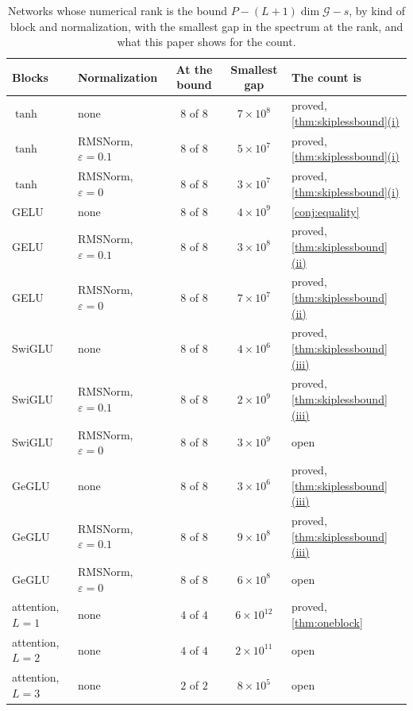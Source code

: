 \documentclass[10pt]{article}
\theoremstyle{definition}
\theoremstyle{remark}
\newcommand{\G}{\mathcal{G}}
\DeclareRobustCommand{\cpref}[2]{\hyperref[#1:#2]{\cref*{#1}(#2)}}
\begin{document}
\begin{table}[ht]
\centering\small
\renewcommand{\arraystretch}{1.1}
\begin{tabular}{@{}llccl@{}}
\toprule
\textbf{Blocks} & \textbf{Normalization} & \textbf{At the bound} & \textbf{Smallest gap} & \textbf{The count is} \\
\midrule
$\tanh$ & none & $8$ of $8$ & $7\times10^{8}$ & proved, \cpref{thm:skiplessbound}{i} \\
$\tanh$ & RMSNorm, $\varepsilon = 0.1$ & $8$ of $8$ & $5\times10^{7}$ & proved, \cpref{thm:skiplessbound}{i} \\
$\tanh$ & RMSNorm, $\varepsilon = 0$ & $8$ of $8$ & $3\times10^{7}$ & proved, \cpref{thm:skiplessbound}{i} \\
GELU & none & $8$ of $8$ & $4\times10^{9}$ & \cref{conj:equality} \\
GELU & RMSNorm, $\varepsilon = 0.1$ & $8$ of $8$ & $3\times10^{8}$ & proved, \cpref{thm:skiplessbound}{ii} \\
GELU & RMSNorm, $\varepsilon = 0$ & $8$ of $8$ & $7\times10^{7}$ & proved, \cpref{thm:skiplessbound}{ii} \\
SwiGLU & none & $8$ of $8$ & $4\times10^{6}$ & proved, \cpref{thm:skiplessbound}{iii} \\
SwiGLU & RMSNorm, $\varepsilon = 0.1$ & $8$ of $8$ & $2\times10^{9}$ & proved, \cpref{thm:skiplessbound}{iii} \\
SwiGLU & RMSNorm, $\varepsilon = 0$ & $8$ of $8$ & $3\times10^{9}$ & open \\
GeGLU & none & $8$ of $8$ & $3\times10^{6}$ & proved, \cpref{thm:skiplessbound}{iii} \\
GeGLU & RMSNorm, $\varepsilon = 0.1$ & $8$ of $8$ & $9\times10^{8}$ & proved, \cpref{thm:skiplessbound}{iii} \\
GeGLU & RMSNorm, $\varepsilon = 0$ & $8$ of $8$ & $6\times10^{8}$ & open \\
\midrule
attention, $L = 1$ & none & $4$ of $4$ & $6\times10^{12}$ & proved, \cref{thm:oneblock} \\
attention, $L = 2$ & none & $4$ of $4$ & $2\times10^{11}$ & open \\
attention, $L = 3$ & none & $2$ of $2$ & $8\times10^{5}$ & open \\
\bottomrule
\end{tabular}
\caption{Networks whose numerical rank is the bound $P - (L+1)\dim\G - s$, by kind of block and normalization, with the smallest gap in the spectrum at the rank, and what this paper shows for the count.}
\label{tab:checks}
\end{table}
\end{document}
